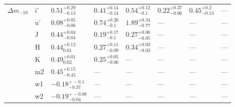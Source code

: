 \begin{longtable*}{lll|lllll}
${\Delta m}_{-10}$		& i' &    $0.51_{-0.13}^{+0.29}$ &  $0.41_{-0.14}^{+0.14}$ &   $0.54_{-0.1}^{+0.12}$ &  $0.22_{-0.06}^{+0.37}$ &   $0.45_{-0.13}^{+0.2}$ &                     --- \\
		& u' &    $0.08_{-0.06}^{+0.05}$ &   $0.74_{-0.1}^{+0.26}$ &  $1.89_{-0.77}^{+0.34}$ &                     --- &                     --- &                     --- \\
		& J  &    $0.44_{-0.04}^{+0.04}$ &   $0.19_{-0.1}^{+0.17}$ &  $0.27_{-0.05}^{+0.06}$ &                     --- &                     --- &                     --- \\
		& H  &     $0.44_{0.01}^{+0.12}$ &  $0.27_{-0.09}^{+0.11}$ &  $0.34_{-0.03}^{+0.03}$ &                     --- &                     --- &                     --- \\
		& K  &     $0.49_{0.02}^{+0.01}$ &  $0.25_{-0.06}^{+0.05}$ &                     --- &                     --- &                     --- &                     --- \\
		& m2 &    $0.45_{-0.45}^{+0.15}$ &                     --- &                     --- &                     --- &                     --- &                     --- \\
		& w1 &   $-0.18_{-0.37}^{+-0.1}$ &                     --- &                     --- &                     --- &                     --- &                     --- \\
		& w2 &  $-0.19_{-0.04}^{+-0.08}$ &                     --- &                     --- &                     --- &                     --- &                     --- \\


\bottomrule
\end{longtable*}
